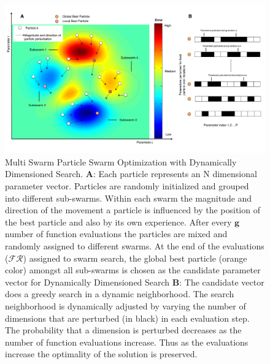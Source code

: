 \documentclass[12pt]{article}
\begin{document}
\begin{figure}[h]
\centering
\includegraphics[width=1.0\textwidth,height=0.5\textheight]{./figs/Figure_1_Algorithm.pdf}
\caption{Multi Swarm Particle Swarm Optimization with Dynamically Dimensioned Search. \textbf{A}: Each particle represents an N dimensional parameter vector. Particles are randomly initialized and grouped into different sub-swarms. Within each swarm the magnitude and direction of the movement a particle is influenced by the position of the best particle and also by its own experience. After every $\mathbf{g}$ number of function evaluations the particles are mixed and randomly assigned to different swarms. At the end of the evaluations ($\mathcal{FR}$) assigned to swarm search, the global best particle (orange color) amongst all sub-swarms is chosen as the candidate parameter vector for Dynamically Dimensioned Search \textbf{B}: The candidate vector does a greedy search in a dynamic neighborhood. The search neighborhood is dynamically adjusted by varying the number of dimensions that are perturbed (in black) in each evaluation step. The probability that a dimension is perturbed decreases as the number of function evaluations increase. Thus as the evaluations increase the optimality of the solution is preserved.
}\label{fig-algorithm}
\end{figure}

\clearpage
\end{document}
